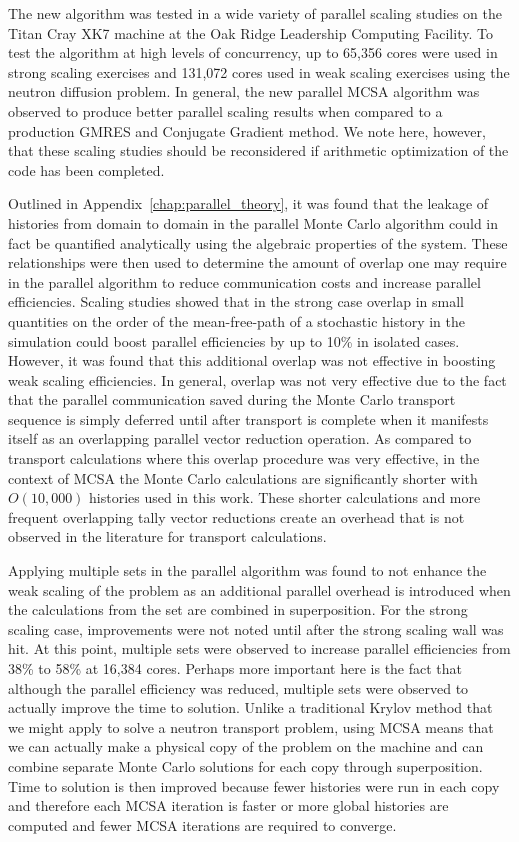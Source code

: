 The new algorithm was tested in a wide variety of parallel scaling
studies on the Titan Cray XK7 machine at the Oak Ridge Leadership
Computing Facility. To test the algorithm at high levels of
concurrency, up to 65,356 cores were used in strong scaling exercises
and 131,072 cores used in weak scaling exercises using the neutron
diffusion problem. In general, the new parallel MCSA algorithm was
observed to produce better parallel scaling results when compared to a
production GMRES and Conjugate Gradient method. We note here, however,
that these scaling studies should be reconsidered if arithmetic
optimization of the code has been completed.

Outlined in Appendix~\ref{chap:parallel_theory}, it was found that the
leakage of histories from domain to domain in the parallel Monte Carlo
algorithm could in fact be quantified analytically using the algebraic
properties of the system. These relationships were then used to
determine the amount of overlap one may require in the parallel
algorithm to reduce communication costs and increase parallel
efficiencies. Scaling studies showed that in the strong case overlap
in small quantities on the order of the mean-free-path of a stochastic
history in the simulation could boost parallel efficiencies by up to
10\% in isolated cases. However, it was found that this additional
overlap was not effective in boosting weak scaling efficiencies. In
general, overlap was not very effective due to the fact that the
parallel communication saved during the Monte Carlo transport sequence
is simply deferred until after transport is complete when it manifests
itself as an overlapping parallel vector reduction operation. As
compared to transport calculations where this overlap procedure was
very effective, in the context of MCSA the Monte Carlo calculations
are significantly shorter with $O(10,000)$ histories used in this
work. These shorter calculations and more frequent overlapping tally
vector reductions create an overhead that is not observed in the
literature for transport calculations.

Applying multiple sets in the parallel algorithm was found to not
enhance the weak scaling of the problem as an additional parallel
overhead is introduced when the calculations from the set are combined
in superposition. For the strong scaling case, improvements were not
noted until after the strong scaling wall was hit. At this point,
multiple sets were observed to increase parallel efficiencies from
38\% to 58\% at 16,384 cores. Perhaps more important here is the fact
that although the parallel efficiency was reduced, multiple sets were
observed to actually improve the time to solution. Unlike a
traditional Krylov method that we might apply to solve a neutron
transport problem, using MCSA means that we can actually make a
physical copy of the problem on the machine and can combine separate
Monte Carlo solutions for each copy through superposition. Time to
solution is then improved because fewer histories were run in each
copy and therefore each MCSA iteration is faster or more global
histories are computed and fewer MCSA iterations are required to
converge.

